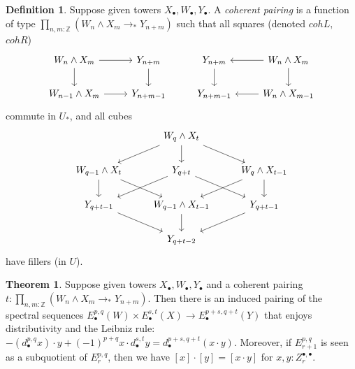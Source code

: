 \documentclass{amsart}
\theoremstyle{definition}
\newtheorem{thm}[theorem]{Theorem}
\newtheorem{de}[theorem]{Definition}
\newcommand{\depfun}[2]{\prod\limits_{#1}^{}{#2}}
\newcommand{\pto}{\to_*}
\begin{document}
\begin{de}\label{coherent-pairing}
Suppose given towers $X_\bullet, W_\bullet, Y_\bullet$. A \textit{coherent pairing} is a function of type $\depfun{n,m: \mathbb{Z}}{(W_n \wedge X_m \pto Y_{n+m})}$ such that all squares (denoted $cohL,$ $cohR$)
    \[\begin{tikzcd}
    	{W_n \wedge X_m} & {Y_{n+m}} & {Y_{n+m}} & {W_n \wedge X_{m}} \\
    	{W_{n-1} \wedge X_m} & {Y_{n+m-1}} & {Y_{n+m-1}} & {W_n \wedge X_{m-1}}
    	\arrow[from=1-1, to=1-2]
    	\arrow[from=1-1, to=2-1]
    	\arrow[from=1-2, to=2-2]
    	\arrow[from=1-3, to=2-3]
    	\arrow[from=1-4, to=1-3]
    	\arrow[from=1-4, to=2-4]
    	\arrow[from=2-1, to=2-2]
    	\arrow[from=2-4, to=2-3]
    \end{tikzcd}\]
    commute in $U_*$, and all cubes
\[\begin{tikzcd}
	& {W_q \wedge X_t} \\
	{W_{q-1} \wedge X_t} & {Y_{q+t}} & {W_{q} \wedge X_{t-1}} \\
	{Y_{q+t - 1}} & {W_{q-1} \wedge X_{t-1}} & {Y_{q+t - 1}} \\
	& {Y_{q+t - 2}}
	\arrow[from=2-1, to=3-2]
	\arrow[from=1-2, to=2-3]
	\arrow[from=2-3, to=3-2]
	\arrow[from=1-2, to=2-2]
	\arrow[from=2-2, to=3-1]
	\arrow[from=2-2, to=3-3]
	\arrow[from=3-3, to=4-2]
	\arrow[from=3-1, to=4-2]
	\arrow[from=3-2, to=4-2]
	\arrow[from=2-3, to=3-3]
	\arrow[from=1-2, to=2-1]
	\arrow[from=2-1, to=3-1]
\end{tikzcd}\]
    have fillers (in $U$).
\end{de}

\begin{thm}\label{th:product-SS}
    Suppose given towers $X_\bullet, W_\bullet, Y_\bullet$ and a coherent pairing $t: \depfun{n,m: \mathbb{Z}}{(W_n \wedge X_m \pto Y_{n+m})}$.
    Then there is an induced pairing of the spectral sequences $E_\bullet^{p,q}(W) \times E_\bullet^{s,t}(X) \to E_\bullet^{p+s,q+t}(Y)$ that enjoys distributivity and the Leibniz rule: $ -(d_\bullet^{p,q} x) \cdot y + (-1)^{p+q} x \cdot d_\bullet^{s,t}y = d_\bullet^{p+s, q+t} (x \cdot y)$.
    Moreover, if $E^{p,q}_{r+1}$ is seen as a subquotient of $E^{p,q}_r$, then we have $[x] \cdot [y] = [x \cdot y]$ for $x, y : Z^{\bullet,\bullet}_r$.
\end{thm}
\end{document}

